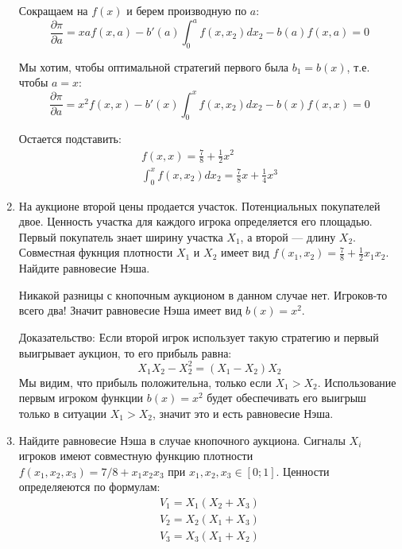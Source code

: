 \begin{enumerate}
Сокращаем на $ f(x) $ и берем производную по $ a $:
\begin{equation}
\frac{\partial \pi}{\partial a}=xaf(x,a)-b'(a)\int_{0}^{a}f(x,x_{2})dx_{2}-b(a)f(x,a)=0
\end{equation}


Мы хотим, чтобы оптимальной стратегий первого была $ b_{1}=b(x) $, т.е. чтобы $ a=x $:
\begin{equation}
\frac{\partial \pi}{\partial a}=x^{2}f(x,x)-b'(x)\int_{0}^{x}f(x,x_{2})dx_{2}-b(x)f(x,x)=0
\end{equation}

Остается подставить:
\begin{equation}
\begin{array}{c}
f(x,x)=\frac{7}{8}+\frac{1}{2}x^{2} \\
\int_{0}^{x}f(x,x_{2})dx_{2}=\frac{7}{8}x+\frac{1}{4}x^{3}
\end{array}
\end{equation}


\item На аукционе второй цены продается участок. Потенциальных покупателей двое. Ценность участка для каждого игрока определяется его площадью. Первый покупатель знает ширину участка $ X_{1} $, а второй --- длину $X_{2}$. Совместная фукнция плотности $ X_{1} $ и $ X_{2} $ имеет вид $ f(x_{1},x_{2})=\frac{7}{8}+\frac{1}{2}x_{1}x_{2} $. Найдите равновесие Нэша.

Никакой разницы с кнопочным аукционом в данном случае нет. Игроков-то всего два! Значит равновесие Нэша имеет вид $ b(x)=x^{2} $. 

Доказательство:
Если второй игрок использует такую стратегию и первый выигрывает аукцион, то его прибыль равна:
\begin{equation}
X_{1}X_{2}-X_{2}^{2}=(X_{1}-X_{2})X_{2}
\end{equation}
Мы видим, что прибыль положительна, только если $ X_{1}>X_{2} $. Использование первым игроком функции $ b(x)=x^{2} $ будет обеспечивать его выигрыш только в ситуации $ X_{1}>X_{2} $, значит это и есть равновесие Нэша.


\item Найдите равновесие Нэша в случае кнопочного аукциона. Сигналы $ X_{i} $ игроков имеют совместную функцию плотности $ f(x_{1},x_{2},x_{3})=7/8+x_{1}x_{2}x_{3} $ при $ x_{1},x_{2},x_{3}\in[0;1] $. Ценности определяеются по формулам:
\begin{equation}
\begin{array}{c}
V_{1}=X_{1}(X_{2}+X_{3}) \\
V_{2}=X_{2}(X_{1}+X_{3}) \\
V_{3}=X_{3}(X_{1}+X_{2}) 
\end{array}
\end{equation}


\end{enumerate}
